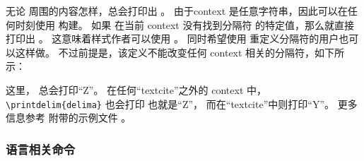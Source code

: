 \begin{ltxexample}[style=latex]{}
\end{ltxexample}
%
无论  周围的内容怎样，总会打印出 。
由于context 是任意字符串，因此可以在任何时刻使用  构建。
如果  在当前 context 没有找到分隔符  的特定值，那么就直接打印出 。
这意味着样式作者可以使用 。
同时希望使用  重定义分隔符的用户也可以这样做。
不过前提是，该定义不能改变任何 context 相关的分隔符，如下所示：

\begin{ltxexample}[style=latex]{}
\renewcommand*{\delima}{Z}
\end{ltxexample}
%
这里， 总会打印“Z”。
在任何“textcite”之外的 context 中，\verb+\printdelim{delima}+ 也会打印  也就是“Z”，
而在“textcite”中则打印“Y”。
更多信息参考 \biblatex 附带的示例文件 。

\subsubsection{语言相关命令}%
\label{use:fmt:lng}


